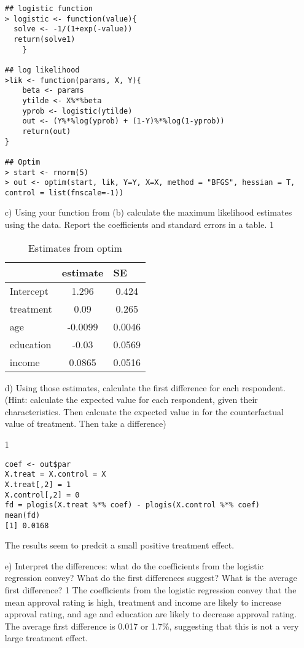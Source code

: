 \documentclass[letterpaper,12pt]{article}
\numberwithin{equation}{section}
\numberwithin{equation}{section}
\newcommand{\solutions}{1}
\begin{document}
\begin{itemize}
{\begin{verbatim}
## logistic function
> logistic <- function(value){
  solve <- -1/(1+exp(-value))
  return(solve1)
	}

## log likelihood
>lik <- function(params, X, Y){
	beta <- params
	ytilde <- X%*%beta
	yprob <- logistic(ytilde)
	out <- (Y%*%log(yprob) + (1-Y)%*%log(1-yprob))
	return(out)
}

## Optim
> start <- rnorm(5)
> out <- optim(start, lik, Y=Y, X=X, method = "BFGS", hessian = T, control = list(fnscale=-1))
\end{verbatim}
}
\fi
\item[c)]  Using your function from (b) calculate the maximum likelihood estimates using the data. Report the coefficients and standard errors in a table.
\if\solutions1
{\color{red}
\begin{table}[h]
\centering
\caption{Estimates from optim}
\begin{tabular}{|l|c|c|}
\hline
          & \multicolumn{1}{l|}{estimate} & \multicolumn{1}{l|}{SE} \\ \hline
Intercept & 1.296                         & 0.424                   \\ \hline
treatment & 0.09                          & 0.265                   \\ \hline
age       & -0.0099                       & 0.0046                  \\ \hline
education & -0.03                         & 0.0569                  \\ \hline
income    & 0.0865                        & 0.0516                  \\ \hline
\end{tabular}
\end{table}
}
\fi

\item[d)]  Using those estimates, calculate the first difference for each respondent.  (Hint: calculate the expected value for each respondent, given their characteristics.  Then calcuate the expected value in for the counterfactual value of treatment.  Then take a difference)

\if\solutions1
{\color{red}

\begin{verbatim}
coef <- out$par
X.treat = X.control = X
X.treat[,2] = 1
X.control[,2] = 0
fd = plogis(X.treat %*% coef) - plogis(X.control %*% coef)
mean(fd)
[1] 0.0168
\end{verbatim}
The results seem to predcit a small positive treatment effect. 
}
\fi

\item[e)] Interpret the differences: what do the coefficients from the logistic regression convey?  What do the first differences suggest? What is the average first difference?
\if\solutions1
{\color{red}
The coefficients from the logistic regression convey that the mean approval rating is high, treatment and income are likely to increase approval rating, and age and education are likely to decrease approval rating. The average first difference is 0.017 or 1.7\%, suggesting that this is not a very large treatment effect.
}
\fi
\end{itemize}
\end{document}
